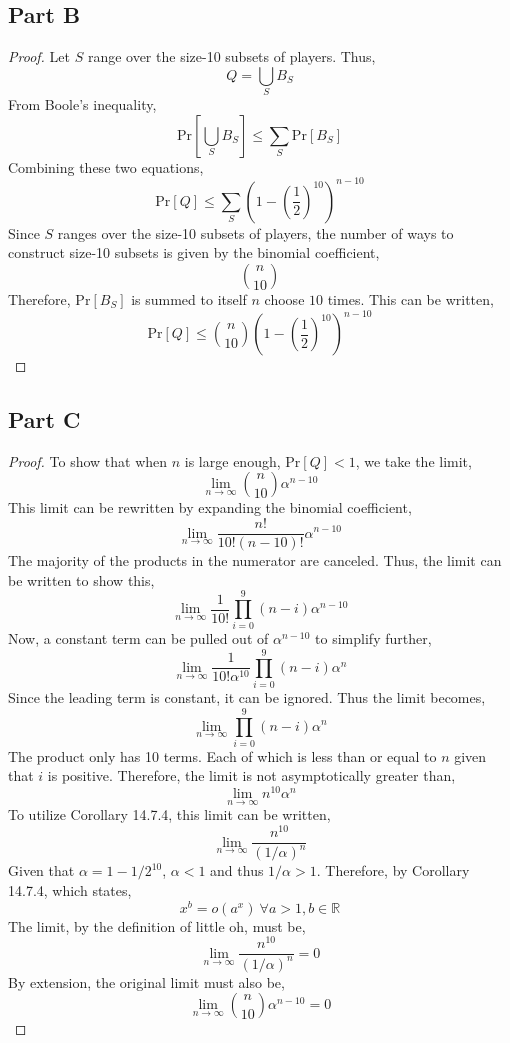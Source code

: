 \documentclass{article}
\begin{document}
\break

\subsection*{Part B}

\begin{proof}

  Let $S$ range over the size-10 subsets of players. Thus,
  $$ Q = \bigcup_{S} B_S $$
  From Boole's inequality,
  $$ \mathrm{Pr}\left[ \bigcup_{S} B_S \right] \leq \sum_{S}
  \mathrm{Pr}\left[B_S\right] $$
  Combining these two equations,
  $$ \mathrm{Pr}[Q] \leq \sum_S \left(1 - \left( \frac{1}{2} \right)^{10}
  \right)^{n - 10} $$
  Since $S$ ranges over the size-10 subsets of players, the number of ways to
  construct size-10 subsets is given by the binomial coefficient,
  $$ \binom{n}{10} $$
  Therefore, $\mathrm{Pr}[B_S]$ is summed to itself $n$ choose $10$ times. This
  can be written,
  $$ \mathrm{Pr}[Q] \leq \binom{n}{10} \left(1 - \left( \frac{1}{2} \right)^{10}
  \right)^{n - 10} $$

\end{proof}

\break

\subsection*{Part C}

\begin{proof}

  To show that when $n$ is large enough, $\mathrm{Pr}[Q] < 1$, we take the
  limit,
  $$ \lim_{n \to \infty} \binom{n}{10} \alpha^{n - 10} $$
  This limit can be rewritten by expanding the binomial coefficient,
  $$ \lim_{n \to \infty} \frac{n!}{10! (n - 10)!} \alpha^{n - 10} $$
  The majority of the products in the numerator are canceled. Thus, the limit
  can be written to show this,
  $$ \lim_{n \to \infty} \frac{1}{10!} \prod_{i = 0}^9 (n - i) \alpha^{n - 10}
  $$
  Now, a constant term can be pulled out of $\alpha^{n-10}$ to simplify further,
  $$ \lim_{n \to \infty} \frac{1}{10! \alpha^{10}} \prod_{i = 0}^9 (n - i)
  \alpha^{n} $$
  Since the leading term is constant, it can be ignored. Thus the limit becomes,
  $$ \lim_{n \to \infty} \prod_{i = 0}^9 (n - i) \alpha^{n} $$
  The product only has 10 terms. Each of which is less than or equal to $n$
  given that $i$ is positive. Therefore, the limit is not asymptotically greater
  than,
  $$  \lim_{n \to \infty} n^{10} \alpha^{n} $$
  To utilize Corollary 14.7.4, this limit can be written,
  $$ \lim_{n \to \infty} \frac{n^{10}}{\left(1/\alpha\right)^n} $$
  Given that $\alpha = 1 - 1/2^{10}$, $\alpha < 1$ and thus $1 / \alpha > 1$.
  Therefore, by Corollary 14.7.4, which states,
  $$ x^b = o(a^x)\ \forall a > 1, b \in \mathbb{R} $$
  The limit, by the definition of little oh, must be,
  $$ \lim_{n \to \infty} \frac{n^{10}}{\left(1/\alpha\right)^n} = 0 $$
  By extension, the original limit must also be,
  $$  \lim_{n \to \infty} \binom{n}{10} \alpha^{n - 10} = 0 $$

\end{proof}
\end{document}
